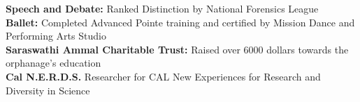\documentclass[9pt]{extarticle}
\newenvironment{changemargin}[2]{%
  \begin{list}{}{%
    \setlength{\topsep}{0pt}%
    \setlength{\leftmargin}{#1}%
    \setlength{\rightmargin}{#2}%
    \setlength{\listparindent}{\parindent}%
    \setlength{\itemindent}{\parindent}%
    \setlength{\parsep}{\parskip}%
  }%
  \item[]}{\end{list}
}
\newenvironment{body} {
	\vspace*{-9pt}
	\begin{changemargin}{-0.5in}{-0.5in}
  }	
	{\end{changemargin}
}
\begin{document}
\begin{body}
	\vspace{-1pt}
	
	\textbf{Speech and Debate: }{ Ranked Distinction by National Forensics League}\\
	\textbf{Ballet: }{ Completed Advanced Pointe training and certified by Mission Dance and Performing Arts Studio}\\
	\textbf{Saraswathi Ammal Charitable Trust: }{ Raised over 6000 dollars towards the orphanage's education}\\
	\textbf{Cal N.E.R.D.S.}{ Researcher for CAL New Experiences for Research and Diversity in Science}
	
%
	
%            
	\end{body}
\end{document}
